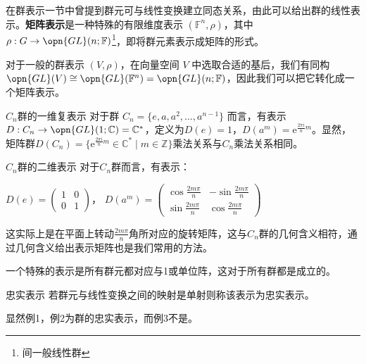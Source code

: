 

在群表示一节中曾提到群元可与线性变换建立同态关系，由此可以给出群的线性表示。\textbf{矩阵表示}是一种特殊的有限维度表示 $(\mathbb{F}^n, \rho)$，其中 $\rho: G \to \opn{GL}(n; \mathbb{F})$\footnote{间一般线性群}，即将群元素表示成矩阵的形式。

对于一般的群表示 $(V, \rho)$，在向量空间 $V$ 中选取合适的基后，我们有同构 $\opn{GL}(V) \cong \opn{GL}(\mathbb{F}^n) = \opn{GL}(n; \mathbb{F})$，因此我们可以把它转化成一个矩阵表示。

\begin{example}{$C_n$群的一维复表示}
对于群 $C_n = \{e, a, a^2, \dots, a^{n - 1}\}$ 而言，有表示 $D: C_n \to \opn{GL}(1; \mathbb{C}) = \mathbb{C}^*$，定义为$D(e)=1$，$D(a^m) = \mathrm{e}^{\frac{2\pi i}{n}m}$。显然，矩阵群$D(C_n) = \{\mathrm{e}^{\frac{2\pi i}{n}m} \in \mathbb{C}^* \mid m \in \mathbb{Z}\}$乘法关系与$C_n$乘法关系相同。
\label{gprep_ex1}
\end{example}

\begin{example}{$C_n$群的二维表示}
对于$C_n$群而言，有表示：

$D(e)=\begin{pmatrix}
 1 & 0\\
 0 &1
\end{pmatrix}$，
$D(a^m)=\begin{pmatrix}
 \cos{\frac{2m\pi}{n}} & -\sin{\frac{2m\pi}{n}}\\
 \sin{\frac{2m\pi}{n}} &\cos{\frac{2m\pi}{n}}
\end{pmatrix}$

这实际上是在平面上转动$\frac{2m\pi}{n}$角所对应的旋转矩阵，这与$C_n$群的几何含义相符，通过几何含义给出表示矩阵也是我们常用的方法。
\end{example}

\begin{example}{}
一个特殊的表示是所有群元都对应与1或单位阵，这对于所有群都是成立的。
\label{gprep_ex3}
\end{example}

\begin{definition}{忠实表示}
若群元与线性变换之间的映射是单射则称该表示为忠实表示。
\end{definition}

显然例1，例2为群的忠实表示，而例3不是。

